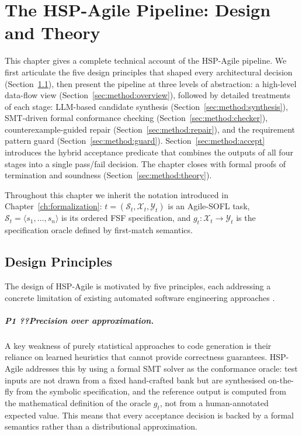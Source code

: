 
\chapter{The HSP-Agile Pipeline: Design and Theory}
\label{ch:method}

This chapter gives a complete technical account of the HSP-Agile pipeline.
We first articulate the five design principles that shaped every architectural
decision (Section~\ref{sec:method:principles}), then present the pipeline at
three levels of abstraction: a high-level data-flow view
(Section~\ref{sec:method:overview}), followed by detailed treatments of each
stage: LLM-based candidate synthesis (Section~\ref{sec:method:synthesis}),
SMT-driven formal conformance checking (Section~\ref{sec:method:checker}),
counterexample-guided repair (Section~\ref{sec:method:repair}), and the
requirement pattern guard (Section~\ref{sec:method:guard}).
Section~\ref{sec:method:accept} introduces the hybrid acceptance predicate
that combines the outputs of all four stages into a single pass/fail decision.
The chapter closes with formal proofs of termination and soundness
(Section~\ref{sec:method:theory}).

Throughout this chapter we inherit the notation introduced in
Chapter~\ref{ch:formalization}: $t = (\mathcal{S}_t, \mathcal{X}_t,
\mathcal{Y}_t)$ is an Agile-SOFL task, $\mathcal{S}_t = \langle
s_1,\ldots,s_n\rangle$ is its ordered FSF specification, and $g_t :
\mathcal{X}_t \to \mathcal{Y}_t$ is the specification oracle defined by
first-match semantics.

\section{Design Principles}
\label{sec:method:principles}

The design of HSP-Agile is motivated by five principles, each addressing a
concrete limitation of existing automated software engineering approaches
\citep{woodcock2009formalsurvey, chen2021codex}.

\paragraph{P1 ??Precision over approximation.}
A key weakness of purely statistical approaches to code generation is their
reliance on learned heuristics that cannot provide correctness guarantees.
HSP-Agile addresses this by using a formal SMT solver as the conformance
oracle: test inputs are not drawn from a fixed hand-crafted bank but are
synthesised on-the-fly from the symbolic specification, and the reference
output is computed from the mathematical definition of the oracle $g_t$, not
from a human-annotated expected value.  This means that every acceptance
decision is backed by a formal semantics rather than a distributional
approximation.

